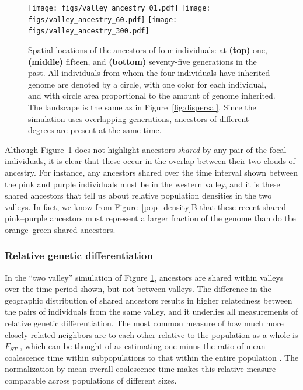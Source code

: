 \documentclass{ar-1col}
\begin{document}
\begin{figure}	%
        \texttt{[image: figs/valley\_ancestry\_01.pdf]}
        \texttt{[image: figs/valley\_ancestry\_60.pdf]}
        \texttt{[image: figs/valley\_ancestry\_300.pdf]}
        \caption{
            Spatial locations of the ancestors of four individuals:
            at 
            \textbf{(top)} one, 
            \textbf{(middle)} fifteen, and
            \textbf{(bottom)} seventy-five generations in the past.
            All individuals from whom the four individuals have inherited genome are denoted by a circle,
            with one color for each individual,
            and with circle area proportional to the amount of genome inherited.
            The landscape is the same as in Figure~\ref{fig:dispersal}.
            Since the simulation uses overlapping generations,
            ancestors of different degrees are present at the same time.
        }
        \label{ancestry_spread}
\end{figure}

Although Figure~\ref{ancestry_spread} does not highlight 
ancestors \textit{shared} by any pair of the focal individuals,
it is clear that these occur in the overlap between their two clouds of ancestry.
For instance, any ancestors shared over the time interval shown
between the pink and purple individuals
must be in the western valley,
and it is these shared ancestors that tell us about relative population densities in the two valleys.
In fact, we know from Figure~\ref{pop_density}B that these recent shared pink--purple ancestors
must represent a larger fraction of the genome
than do the orange--green shared ancestors.


\subsubsection{Relative genetic differentiation}

In the ``two valley'' simulation of Figure \ref{ancestry_spread},
ancestors are shared within valleys over the time period shown,
but not between valleys.
The difference in the geographic distribution of shared ancestors 
results in higher relatedness between the pairs of individuals 
from the same valley, 
and it underlies all measurements of relative genetic differentiation.
The most common measure of
how much more closely related neighbors are to each other relative to the population as a whole
is $F_{ST}$ \citep{Wright1951},
which can be thought of as estimating
one minus the ratio of mean coalescence time within subpopulations
to that within the entire population \citep{slatkin_1991inbreeding}.
The normalization by mean overall coalescence time 
makes this relative measure comparable across populations of different sizes.
\end{document}
